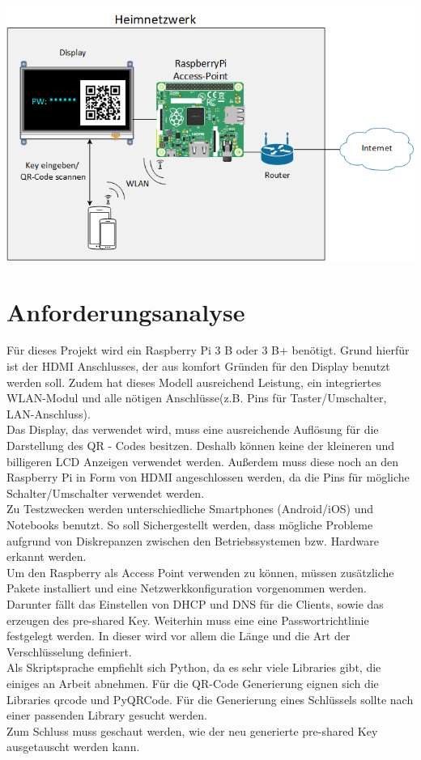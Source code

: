 \documentclass[a4paper]{article}
\begin{document}
	\includegraphics[scale=0.6]{skizze}
	
	\section{Anforderungsanalyse}

	Für dieses Projekt wird ein Raspberry Pi 3 B oder 3 B+ benötigt. Grund hierfür ist der HDMI Anschlusses, der aus komfort Gründen für den Display benutzt werden soll. Zudem hat dieses Modell ausreichend Leistung, ein integriertes WLAN-Modul und alle nötigen Anschlüsse(z.B. Pins für Taster/Umschalter, LAN-Anschluss). \\
	Das Display, das verwendet wird, muss eine ausreichende Auflösung für die Darstellung des QR - Codes besitzen. Deshalb können keine der kleineren und billigeren LCD Anzeigen verwendet werden. Außerdem muss diese noch an den Raspberry Pi in Form von HDMI angeschlossen werden, da die Pins für mögliche Schalter/Umschalter verwendet werden. \\
	Zu Testzwecken werden unterschiedliche Smartphones (Android/iOS) und Notebooks benutzt. So soll Sichergestellt werden, dass mögliche Probleme aufgrund von Diskrepanzen zwischen den Betriebssystemen bzw. Hardware erkannt werden.\\
	Um den Raspberry als Access Point verwenden zu können, müssen zusätzliche Pakete installiert und eine Netzwerkkonfiguration vorgenommen werden. Darunter fällt das Einstellen von DHCP und DNS für die Clients, sowie das erzeugen des pre-shared Key. Weiterhin muss eine eine Passwortrichtlinie festgelegt werden. In dieser wird vor allem die Länge und die Art der Verschlüsselung definiert.\\
	Als Skriptsprache empfiehlt sich Python, da es sehr viele Libraries gibt, die einiges an Arbeit abnehmen. Für die QR-Code Generierung eignen sich die Libraries qrcode und PyQRCode. Für die Generierung eines Schlüssels sollte nach einer passenden Library gesucht werden.\\
	Zum Schluss muss geschaut werden, wie der neu generierte pre-shared Key ausgetauscht werden kann.\\
	
\end{document}
